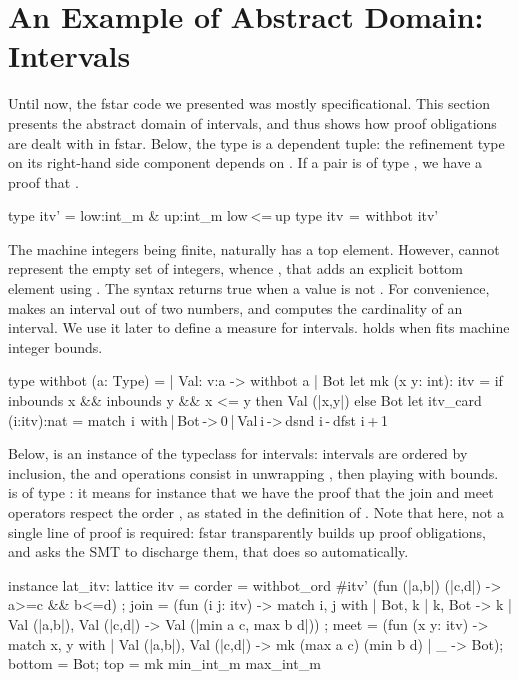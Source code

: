 \documentclass{llncs}
\begin{document}
\section{An Example of Abstract Domain: Intervals}
\label{abint:section:intervals}
%
Until now, the \gls{fstar} code we presented was mostly
specificational.
%
This section presents the abstract domain of intervals, and thus
shows how proof obligations are dealt with in \gls{fstar}.
%
Below, the type  is a dependent tuple: the refinement
type on its right-hand side component  depends on
.
%
If a pair  is of type , we have a proof
that .
%
\begin{fstarcode}
type itv' = low:int_m & up:int_m {low <= up}    type itv  =  withbot itv'
\end{fstarcode}
%
The machine integers being finite,  naturally has a
top element.
%
However,  cannot represent the empty set of integers,
whence , that adds an explicit bottom element using
.
%
The syntax  returns true when a value is not
.
%
For convenience,  makes an interval out of two numbers,
and  computes the cardinality of an interval. We
use it later to define a measure for intervals.
%
 holds when  fits machine integer
bounds.
%
\begin{fstarcode}
type withbot (a: Type) = | Val: v:a -> withbot a | Bot
let mk (x y: int): itv = if inbounds x && inbounds y && x <= y
                       then Val (|x,y|) else Bot
let itv_card (i:itv):nat = match  i  with | Bot -> 0 | Val i -> dsnd i - dfst i + 1
\end{fstarcode}
%
Below,  is an instance of the typeclass
 for intervals: intervals are ordered by inclusion,
the  and  operations consist in unwrapping
, then playing with bounds.
%
 is of type : it means for
instance that we have the proof that the join and meet operators
respect the order , as stated in the
definition of .
%
Note that here, not a single line of proof is required:
\gls{fstar} transparently builds up proof obligations, and asks
the SMT to discharge them, that does so automatically.
%
\begin{fstarcode}
instance lat_itv: lattice itv =
  { corder = withbot_ord #itv' (fun (|a,b|) (|c,d|) -> a>=c && b<=d)
  ; join = (fun (i j: itv) -> match i, j with
       | Bot, k | k, Bot -> k
       | Val (|a,b|), Val (|c,d|) -> Val (|min a c, max b d|))
  ; meet = (fun (x y: itv) -> match x, y with
       | Val (|a,b|), Val (|c,d|) -> mk (max a c) (min b d)
       | _ -> Bot); bottom = Bot; top = mk min_int_m max_int_m }
\end{fstarcode}
\end{document}
